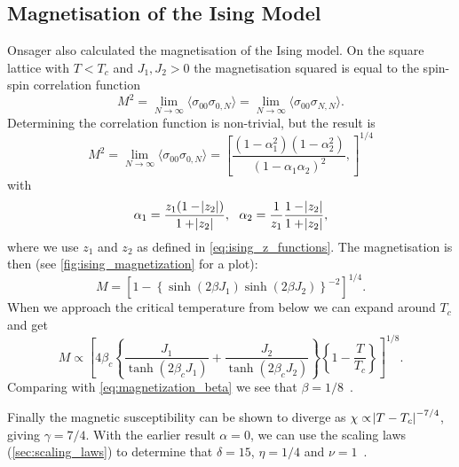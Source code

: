 \documentclass[11pt, a4paper]{report} %
\begin{document}
\subsection{Magnetisation of the Ising Model}\label{sec:ising_magnetization}

Onsager also calculated the magnetisation of the Ising model.
On the square lattice with \(T < T_c\) and \(J_1, J_2 > 0\) the magnetisation squared is equal to the spin-spin correlation function
\begin{equation}
	M^2 = \lim_{N \to \infty} \langle \sigma_{00} \sigma_{0,N} \rangle = \lim_{N \to \infty} \langle \sigma_{00} \sigma_{N, N} \rangle.
\end{equation}
Determining the correlation function is non-trivial, but the result is
\begin{equation}
	M^2 = \lim_{N \to \infty} \langle \sigma_{00} \sigma_{0,N} \rangle = \left[ \frac{(1-\alpha_1^2)(1-\alpha_2^2)}{(1-\alpha_1 \alpha_2)^2}, \right]^{1/4}
\end{equation}
with
\begin{equation}
	\alpha_1 = \frac{z_1(1-\abs{z_2})}{1+\abs{z_2}},\ \ \alpha_2 = \frac{1}{z_1}\frac{1-\abs{z_2}}{1+\abs{z_2}},
\end{equation}
where we use \(z_1\) and \(z_2\) as defined in \cref{eq:ising_z_functions}.
The magnetisation is then (see \cref{fig:ising_magnetization} for a plot):
\begin{equation}
	M = \left[1 - \left\{\sinh(2\beta J_1)\sinh(2 \beta J_2)\right\}^{-2} \right]^{1/4}.
\end{equation}
When we approach the critical temperature from below we can expand around \(T_c\) and get
\begin{equation}
	M \propto \left[4\beta_c\left\{\frac{J_1}{\tanh(2\beta_c J_1)} + \frac{J_2}{\tanh(2\beta_c J_2)}\right\} \left\{1-\frac{T}{T_c}\right\}\right]^{1/8}.
\end{equation}
Comparing with \cref{eq:magnetization_beta} we see that \(\beta = 1/8\)~\cite{wu:1982}.

Finally the magnetic susceptibility can be shown to diverge as \(\chi \propto \abs{T - T_c}^{-7/4}\), giving \(\gamma = 7/4\).
With the earlier result \(\alpha=0\), we can use the scaling laws (\cref{sec:scaling_laws}) to determine that \(\delta = 15\), \(\eta = 1/4\) and \(\nu = 1\)~\cite{binney:1992}.
\end{document}
